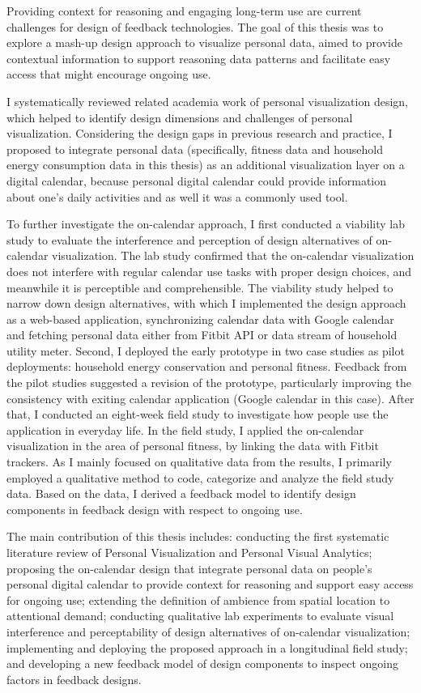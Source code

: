 \documentclass[12pt,oneside]{book}
\begin{document}
\label{chap:conclusion}
Providing context for reasoning and engaging long-term use are current challenges for design of feedback technologies. The goal of this thesis was to explore a mash-up design approach to visualize personal data, aimed to provide contextual information to support reasoning data patterns and facilitate easy access that might encourage ongoing use.

I systematically reviewed related academia work of personal visualization design, which helped to identify design dimensions and challenges of personal visualization. Considering the design gaps in previous research and practice, I proposed to integrate personal data (specifically, fitness data and household energy consumption data in this thesis) as an additional visualization layer on a digital calendar, because personal digital calendar could provide information about one's daily activities and as well it was a commonly used tool.

To further investigate the on-calendar approach, I first conducted a viability lab study to evaluate the interference and perception of design alternatives of on-calendar visualization. The lab study confirmed that the on-calendar visualization does not interfere with regular calendar use tasks with proper design choices, and meanwhile it is perceptible and comprehensible. The viability study helped to narrow down design alternatives, with which I implemented the design approach as a web-based application, synchronizing calendar data with Google calendar and fetching personal data either from Fitbit API or data stream of household utility meter. Second, I deployed the early prototype in two case studies as pilot deployments: household energy conservation and personal fitness. Feedback from the pilot studies suggested a revision of the prototype, particularly improving the consistency with exiting calendar application (Google calendar in this case). After that, I conducted an eight-week field study to investigate how people use the application in everyday life. In the field study, I applied the on-calendar visualization in the area of personal fitness, by linking the data with Fitbit trackers. As I mainly focused on qualitative data from the results, I primarily employed a qualitative method to code, categorize and analyze the field study data. Based on the data, I derived a feedback model to identify design components in feedback design with respect to ongoing use.

The main contribution of this thesis includes: conducting the first systematic literature review of Personal Visualization and Personal Visual Analytics; proposing the on-calendar design that integrate personal data on people's personal digital calendar to provide context for reasoning and support easy access for ongoing use; extending the definition of ambience from spatial location to attentional demand; conducting qualitative lab experiments to evaluate visual interference and perceptability of design alternatives of on-calendar visualization; implementing and deploying the proposed approach in a longitudinal field study; and developing a new feedback model of design components to inspect ongoing factors in feedback designs.
\end{document}
